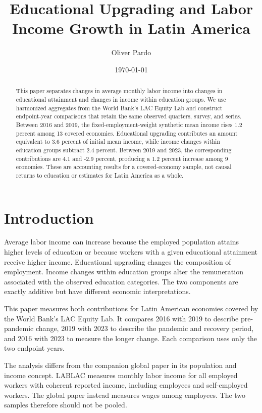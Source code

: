 \documentclass[11pt]{article}
\title{Educational Upgrading and Labor Income Growth in Latin America}
\author{Oliver Pardo}
\date{\today}
\begin{document}
\maketitle

\begin{abstract}
This paper separates changes in average monthly labor income into changes in
educational attainment and changes in income within education groups. We use
harmonized aggregates from the World Bank's LAC Equity Lab and construct
endpoint-year comparisons that retain the same observed quarters, survey, and
series. Between 2016 and 2019, the fixed-employment-weight synthetic mean
income rises 1.2 percent among 13 covered economies. Educational upgrading
contributes an amount equivalent to 3.6 percent of initial mean income, while
income changes within education groups subtract 2.4 percent. Between 2019 and
2023, the corresponding contributions are 4.1 and -2.9 percent, producing a
1.2 percent increase among 9 economies. These are accounting results for a
covered-economy sample, not causal returns to education or estimates for Latin
America as a whole.
\end{abstract}

\section{Introduction}

Average labor income can increase because the employed population attains
higher levels of education or because workers with a given educational
attainment receive higher income. Educational upgrading changes the
composition of employment. Income changes within education groups alter the
remuneration associated with the observed education categories. The two
components are exactly additive but have different economic interpretations.

This paper measures both contributions for Latin American economies covered
by the World Bank's LAC Equity Lab. It compares 2016 with 2019 to describe
pre-pandemic change, 2019 with 2023 to describe the pandemic and recovery
period, and 2016 with 2023 to measure the longer change. Each comparison uses
only the two endpoint years.

The analysis differs from the companion global paper in its population and
income concept. LABLAC measures monthly labor income for all employed workers
with coherent reported income, including employees and self-employed workers.
The global paper instead measures wages among employees. The two samples
therefore should not be pooled.
\end{document}
